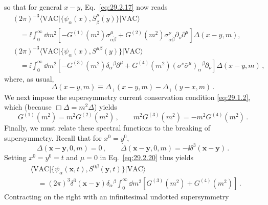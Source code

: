 so that for general \(x-y\), Eq.~\eqref{eq:29.2.17} now reads
\begin{equation}
  \begin{aligned}
  &(2\pi)^{-3}
  \langle\mathrm{VAC}\lvert
    \{\psi_\alpha(x),\bar S^\mu_{\dot\beta}(y)\}
  \rvert\mathrm{VAC}\rangle
  \\
  &\quad=\ii\int_0^\infty \dd m^2
  \left[
    -G^{(1)}(m^2)\sigma^\mu_{\alpha\dot\beta}
    +G^{(2)}(m^2)\sigma^\nu_{\alpha\dot\beta}
      \partial_\nu\partial^\mu
  \right]\Delta(x-y,m),
  \\
  &(2\pi)^{-3}
  \langle\mathrm{VAC}\lvert
    \{\psi_\alpha(x),S^{\mu\beta}(y)\}
  \rvert\mathrm{VAC}\rangle
  \\
  &\quad=\ii\int_0^\infty \dd m^2
  \left[
    -G^{(3)}(m^2)\delta_\alpha{}^\beta\partial^\mu
    +G^{(4)}(m^2)
      (\sigma^\nu\bar\sigma^\mu)_\alpha{}^\beta\partial_\nu
  \right]\Delta(x-y,m)\,,
  \end{aligned}
  \tag{29.2.20}\label{eq:29.2.20}
\end{equation}
where, as usual,
\begin{equation}
  \Delta(x-y,m)
  \equiv
  \Delta_+(x-y,m)-\Delta_+(y-x,m)\,.
  \tag{29.2.21}\label{eq:29.2.21}
\end{equation}
We next impose the supersymmetry current conservation condition
\eqref{eq:29.1.2}, which (because \(\Box\Delta=m^2\Delta\)) yields
\begin{equation}
  G^{(1)}(m^2)=m^2G^{(2)}(m^2)\,,
  \qquad
  m^2G^{(3)}(m^2)=-m^2G^{(4)}(m^2)\,.
  \tag{29.2.22}\label{eq:29.2.22}
\end{equation}
Finally, we must relate these spectral functions to the breaking of
supersymmetry. Recall that for \(x^0=y^0\),
\[
  \Delta(\mathbf x-\mathbf y,0,m)=0\,,
  \qquad
  \dot\Delta(\mathbf x-\mathbf y,0,m)
  =-\ii\delta^3(\mathbf x-\mathbf y)\,.
\]
Setting \(x^0=y^0=t\) and \(\mu=0\) in Eq.~\eqref{eq:29.2.20} thus yields
\begin{equation}
  \begin{aligned}
  &\langle\mathrm{VAC}\lvert
    \{\psi_\alpha(\mathbf x,t),S^{0\beta}(\mathbf y,t)\}
  \rvert\mathrm{VAC}\rangle
  \\
  &\quad=
  (2\pi)^3\delta^3(\mathbf x-\mathbf y)
  \delta_\alpha{}^\beta
  \int_0^\infty \dd m^2
  \left[G^{(3)}(m^2)+G^{(4)}(m^2)\right]\,.
  \end{aligned}
  \tag{29.2.23}\label{eq:29.2.23}
\end{equation}
Contracting on the right with an infinitesimal undotted supersymmetry
